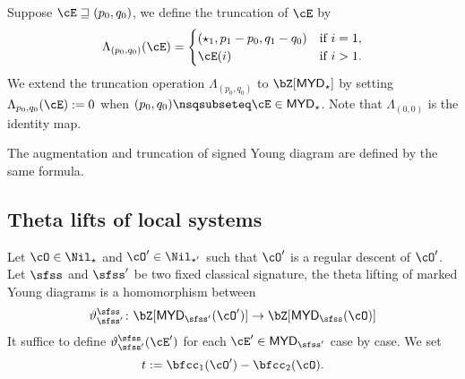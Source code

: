 \documentclass[12pt,a4paper]{amsart}
\def\abs#1{\left|{#1}\right|}
\def\MYD{{\mathsf{MYD}}}
\numberwithin{equation}{section}
\theoremstyle{remark}
\def\lsign{{}^l\mathrm{Sign}}
\begin{document}
Suppose $\cE\sqsupseteq (p_{0},q_{0})$, we define the truncation of $\cE$ by
\[
  \Lambda_{(p_{0},q_{0})}(\cE) = \begin{cases}
    (\star_{1},p_{1}-p_{0},q_{1}-q_{0}) & \text{if } i=1,\\
    \cE(i) & \text{if } i>1.
  \end{cases}
\]
We extend the truncation operation $\Lambda_{( p_{0},q_{0} )}$ to
$\bZ[\MYD_{\star}]$
by setting $\Lambda_{p_{0},q_{0}}(\cE) := 0$ when $(p_{0},q_{0})\nsqsubseteq \cE\in \MYD_{\star}$.
Note that $\Lambda_{(0,0)}$ is the identity map.

The augmentation and truncation of signed Young diagram are defined by the same
formula.

\medskip



\def\cEp{\cE'}
\subsection{Theta lifts of local systems}

Let $\cO\in \Nil_{\star}$ and $\cO'\in \Nil_{\star'}$ such that  $\cO'$ is a
regular descent of $\cO'$.
Let $\sfss$ and $\sfss'$ be two fixed classical signature,
the theta lifting of marked Young diagrams is a homomorphism between
\[
  \dlift \colon \bZ[\MYD_{\sfss'}(\cO')]\rightarrow \bZ[\MYD_{\sfss}(\cO)]
\]
It suffice to define $\dlift(\cEp)$ for  each $\cEp\in \MYD_{\sfss'}$ case by case.
We set
\[
  t := \bfcc_{1}(\cO')-\bfcc_{2}(\cO).
\]
\end{document}
